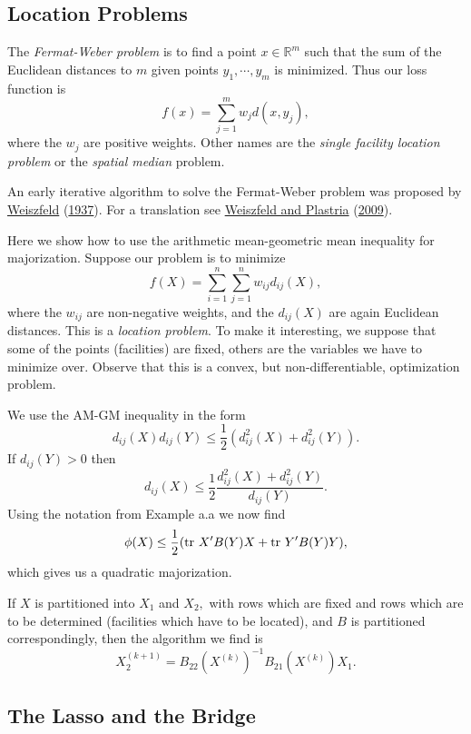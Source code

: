 \documentclass[
  12pt,
]{book}
\begin{document}
\hypertarget{location-problems}{%
\subsection{Location Problems}\label{location-problems}}

The \emph{Fermat-Weber problem} is to find a point \(x\in\mathbb{R}^m\) such that the sum of the Euclidean distances to \(m\) given points \(y_1,\cdots,y_m\) is minimized. Thus our loss function is
\[
f(x)=\sum_{j=1}^m w_jd(x,y_j),
\]
where the \(w_j\) are positive weights. Other names are the \emph{single facility location problem} or the \emph{spatial median} problem.

An early iterative algorithm to solve the Fermat-Weber problem was proposed by \protect\hyperlink{ref-weiszfeld_37}{Weiszfeld} (\protect\hyperlink{ref-weiszfeld_37}{1937}). For a translation see
\protect\hyperlink{ref-weiszfeld_plastria_09}{Weiszfeld and Plastria} (\protect\hyperlink{ref-weiszfeld_plastria_09}{2009}).

Here we show how to use the arithmetic mean-geometric
mean inequality for majorization. Suppose our problem is to
minimize
\[
f(X)=\sum_{i=1}^n\sum_{j=1}^n w_{ij}d_{ij}(X),
\]
where the \(w_{ij}\) are non-negative weights, and the \(d_{ij}(X)\) are again Euclidean distances. This is a
\emph{location problem}. To make it interesting, we suppose that some of the points (facilities) are fixed, others are the variables we
have to minimize over. Observe that this is a convex, but non-differentiable, optimization problem.

We use the AM-GM
inequality in the form
\[
d_{ij}(X)d_{ij}(Y)\leq\frac{1}{2}(d_{ij}^2(X)+d_{ij}^2(Y)).
\]
If \(d_{ij}(Y)>0\) then
\[
d_{ij}(X)\leq\frac{1}{2}\frac{d_{ij}^2(X)+d_{ij}^2(Y)}
{d_{ij}(Y)}.
\]
Using the notation from Example a.a we now find
\[
\phi(X)\leq\frac{1}{2}(\hbox{tr }X'B(Y)X+\hbox{tr }Y'B(Y)Y),
\]
which gives us a quadratic majorization.

If \(X\) is partitioned
into \(X_1\) and \(X_2,\) with rows which are fixed and rows which are to be determined
(facilities which have to be located), and \(B\) is partitioned
correspondingly, then the algorithm we find is
\[
X_2^{(k+1)}=B_{22}(X^{(k)})^{-1}B_{21}(X^{(k)})X_1.
\]

\hypertarget{the-lasso-and-the-bridge}{%
\subsection{The Lasso and the Bridge}\label{the-lasso-and-the-bridge}}
\end{document}
